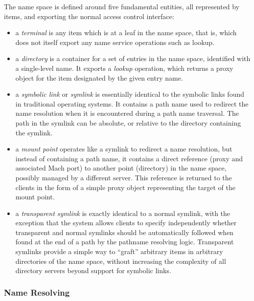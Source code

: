 The name space is defined around five fundamental entities, all
represented by items, and exporting the normal access control
interface:
\begin{itemize}
\item a {\em terminal} is any item which is at a leaf in the name
space, that is, which does not itself export any name service
operations such as lookup.

\item a {\em directory} is a container for a set of entries in the
name space, identified with a single-level name. It exports a {\em
lookup} operation, which returns a proxy object for the item
designated by the given entry name.

\item a {\em symbolic link} or {\em symlink} is essentially identical
to the symbolic links found in traditional operating systems. It
contains a path name used to redirect the name resolution when it is
encountered during a path name traversal. The path in the symlink can
be absolute, or relative to the directory containing the symlink.

\item a {\em mount point} operates like a symlink to redirect a name
resolution, but instead of containing a path name, it contains a
direct reference (proxy and associated Mach port) to another point
(directory) in the name space, possibly managed by a different server.
This reference is returned to the clients in the form of a simple
proxy object representing the target of the mount point.

\item a {\em transparent symlink} is exactly identical to a normal
symlink, with the exception that the system allows clients to specify
independently whether transparent and normal symlinks should be
automatically followed when found at the end of a path by the pathname
resolving logic.  Transparent symlinks provide a simple way to
``graft'' arbitrary items in arbitrary directories of the name space,
without increasing the complexity of all directory servers beyond
support for symbolic links.
\end{itemize}

\subsubsection{Name Resolving}

